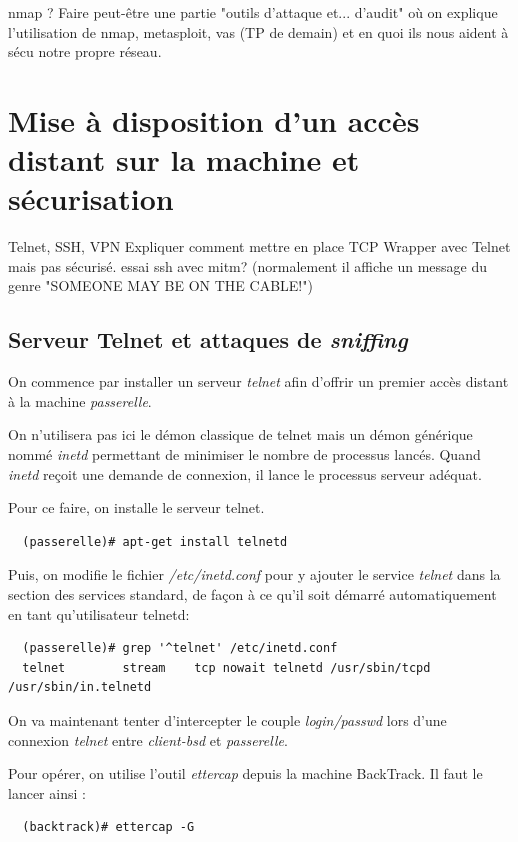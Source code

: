 \documentclass[a4paper]{article}
\begin{document}
nmap ? Faire peut-être une partie "outils d'attaque et... d'audit"
où on explique l'utilisation de nmap, metasploit, vas (TP de demain)
et en quoi ils nous aident à sécu notre propre réseau.

\section{Mise à disposition d'un accès distant sur la machine et sécurisation}
Telnet, SSH, VPN
Expliquer comment mettre en place TCP Wrapper avec Telnet mais pas sécurisé.
essai ssh avec mitm? (normalement il affiche un message du genre
"SOMEONE MAY BE ON THE CABLE!")

\subsection{Serveur Telnet et attaques de \textit{sniffing}}

On commence par installer un serveur \textit{telnet} afin d'offrir
un premier accès distant à la machine \textit{passerelle}.

On n'utilisera pas ici le démon classique de telnet mais un démon
générique nommé \textit{inetd} permettant de minimiser le nombre
de processus lancés. Quand \textit{inetd} reçoit une demande 
de connexion, il lance le processus serveur adéquat. 

Pour ce faire, on installe le serveur telnet.
\begin{verbatim}
  (passerelle)# apt-get install telnetd
\end{verbatim}

Puis, on modifie le fichier \textit{/etc/inetd.conf} pour y
ajouter le service \textit{telnet} dans la section des services
standard, de façon à ce qu'il soit démarré automatiquement
en tant qu'utilisateur telnetd:
\begin{verbatim}
  (passerelle)# grep '^telnet' /etc/inetd.conf
  telnet        stream    tcp nowait telnetd /usr/sbin/tcpd /usr/sbin/in.telnetd
\end{verbatim}

\vspace{1\baselineskip}
On va maintenant tenter d'intercepter le couple \textit{login/passwd}
lors d'une connexion \textit{telnet} entre \textit{client-bsd}
et \textit{passerelle}.

Pour opérer, on utilise l'outil \textit{ettercap} depuis la machine BackTrack. 
Il faut le lancer ainsi :
\begin{verbatim}
  (backtrack)# ettercap -G
\end{verbatim}
\end{document}
